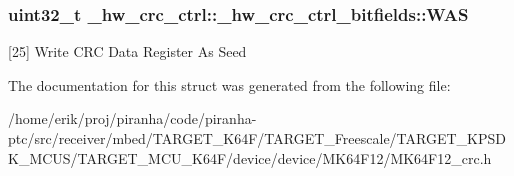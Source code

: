 \subsubsection[{\texorpdfstring{W\+AS}{WAS}}]{\setlength{\rightskip}{0pt plus 5cm}uint32\+\_\+t \+\_\+hw\+\_\+crc\+\_\+ctrl\+::\+\_\+hw\+\_\+crc\+\_\+ctrl\+\_\+bitfields\+::\+W\+AS}\hypertarget{struct__hw__crc__ctrl_1_1__hw__crc__ctrl__bitfields_aa7eab0c795f4742591ee238499b9871c}{}\label{struct__hw__crc__ctrl_1_1__hw__crc__ctrl__bitfields_aa7eab0c795f4742591ee238499b9871c}
\mbox{[}25\mbox{]} Write C\+RC Data Register As Seed 

The documentation for this struct was generated from the following file\+:\begin{DoxyCompactItemize}
\item 
/home/erik/proj/piranha/code/piranha-\/ptc/src/receiver/mbed/\+T\+A\+R\+G\+E\+T\+\_\+\+K64\+F/\+T\+A\+R\+G\+E\+T\+\_\+\+Freescale/\+T\+A\+R\+G\+E\+T\+\_\+\+K\+P\+S\+D\+K\+\_\+\+M\+C\+U\+S/\+T\+A\+R\+G\+E\+T\+\_\+\+M\+C\+U\+\_\+\+K64\+F/device/device/\+M\+K64\+F12/M\+K64\+F12\+\_\+crc.\+h\end{DoxyCompactItemize}
